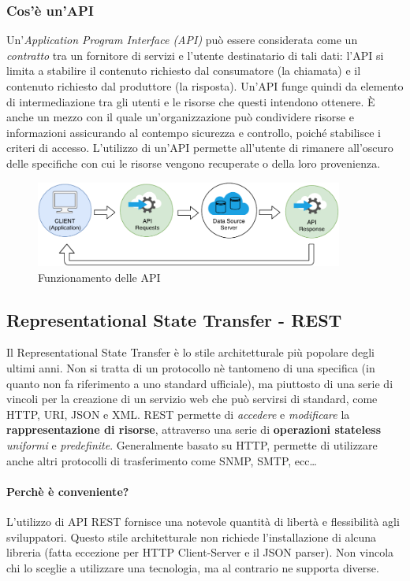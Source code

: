 \subsubsection{Cos'è un'API}
Un'\textit{Application Program Interface (API)} può essere considerata come un \emph{contratto} tra un fornitore di servizi e l'utente destinatario di tali dati: l'API si limita a stabilire il contenuto richiesto dal consumatore (la chiamata) e il contenuto richiesto dal produttore (la risposta). Un'API funge quindi da elemento di intermediazione tra gli utenti e le risorse che questi intendono ottenere. È anche un mezzo con il quale un'organizzazione può condividere risorse e informazioni assicurando al contempo sicurezza e controllo, poiché stabilisce i criteri di accesso. L'utilizzo di un'API permette all'utente di rimanere all'oscuro delle specifiche con cui le risorse vengono recuperate o della loro provenienza.
\begin{figure}[H]
    \centering
    \includegraphics[width=0.90\textwidth]{images/01_9_api.pdf}
    \caption{Funzionamento delle API}
    \label{fig:api}
\end{figure}

\subsection{Representational State Transfer - REST}
Il Representational State Transfer è lo stile architetturale più popolare degli ultimi anni. Non si tratta di un protocollo nè tantomeno di una specifica (in quanto non fa riferimento a uno standard ufficiale), ma piuttosto di una serie di vincoli per la creazione di un servizio web che può servirsi di standard,  come HTTP, URI, JSON e XML. REST permette di \textit{accedere} e \textit{modificare} la \textbf{rappresentazione di risorse}, attraverso una serie di \textbf{operazioni stateless} \textit{uniformi} e \textit{predefinite}. Generalmente basato su HTTP, permette di utilizzare anche altri protocolli di trasferimento come SNMP, SMTP, ecc\dots

\paragraph{Perchè è conveniente?} L'utilizzo di API REST fornisce una notevole quantità di libertà e flessibilità agli sviluppatori. Questo stile architetturale non richiede l'installazione di alcuna libreria (fatta eccezione per HTTP Client-Server e il JSON parser). Non vincola  chi lo sceglie a utilizzare una tecnologia, ma al contrario ne supporta diverse.

